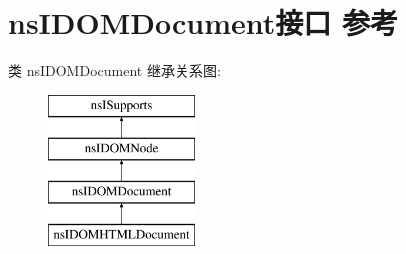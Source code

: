 \hypertarget{interfacens_i_d_o_m_document}{}\section{ns\+I\+D\+O\+M\+Document接口 参考}
\label{interfacens_i_d_o_m_document}
类 ns\+I\+D\+O\+M\+Document 继承关系图\+:\begin{figure}[H]
\begin{center}
\leavevmode
\includegraphics[height=4.000000cm]{interfacens_i_d_o_m_document}
\end{center}
\end{figure}
